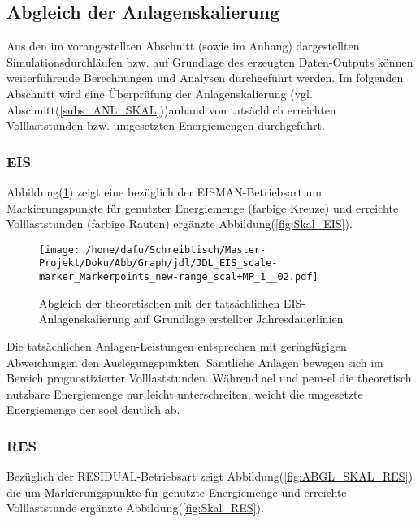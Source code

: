 \documentclass[onecolumn,10pt,titlepage]{article}
\begin{document}
\newpage
\subsection{Abgleich der Anlagenskalierung}
Aus den im vorangestellten Abschnitt (sowie im Anhang) dargestellten Simulationsdurchläufen bzw. auf Grundlage des erzeugten Daten-Outputs können weiterführende Berechnungen und Analysen durchgeführt werden. Im folgenden Abschnitt wird eine Überprüfung der Anlagenskalierung (vgl. Abschnitt(\ref{subs_ANL_SKAL}))anhand von tatsächlich erreichten Volllaststunden bzw. umgesetzten Energiemengen durchgeführt.

\subsubsection{EIS}
Abbildung(\ref{fig:ABGL_SKAL_EIS}) zeigt eine bezüglich der EISMAN-Betriebsart um Markierungspunkte für genutzter Energiemenge (farbige Kreuze) und erreichte Volllaststunden (farbige Rauten) ergänzte Abbildung(\ref{fig:Skal_EIS}). 
\begin{figure}[H]
	
	\centering
	\texttt{[image: /home/dafu/Schreibtisch/Master-Projekt/Doku/Abb/Graph/jdl/JDL\_EIS\_scale-marker\_Markerpoints\_new-range\_scal+MP\_1\_\_02.pdf]}
	\caption[Abgleich Anlagenskalierung -EIS]{Abgleich der theoretischen mit der tatsächlichen EIS-Anlagenskalierung auf Grundlage erstellter Jahresdauerlinien}
	\label{fig:ABGL_SKAL_EIS} 
\end{figure}
Die tatsächlichen Anlagen-Leistungen entsprechen mit geringfügigen Abweichungen den Auslegungspunkten. Sämtliche Anlagen bewegen sich im Bereich prognostizierter Volllaststunden. Während \gls{ael} und \gls{pem}-\gls{el} die theoretisch nutzbare Energiemenge nur leicht unterschreiten, weicht die umgesetzte Energiemenge der \gls{soel} deutlich ab. 
\newpage
\subsubsection{RES}
Bezüglich der RESIDUAL-Betriebsart zeigt Abbildung(\ref{fig:ABGL_SKAL_RES}) die um Markierungspunkte für genutzte Energiemenge und erreichte Volllaststunde ergänzte Abbildung(\ref{fig:Skal_RES}).\\
\end{document}
